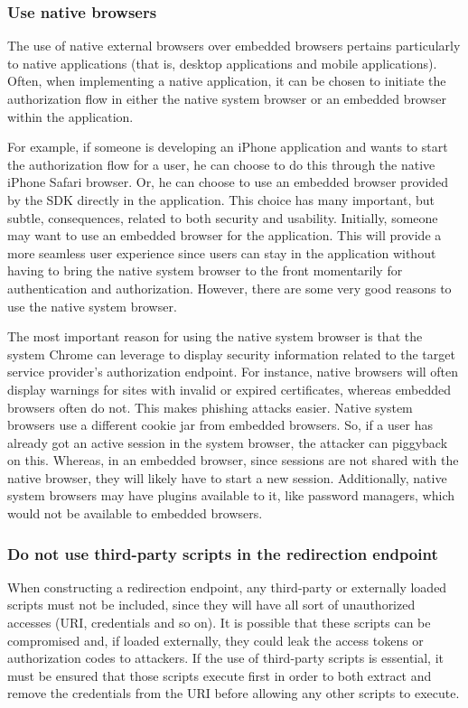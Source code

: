 \subsubsection{Use native browsers}
\label{native}
The use of native external browsers over embedded browsers pertains particularly to native applications (that is, desktop applications and mobile applications). Often, when implementing a native application, it can be chosen to initiate the authorization flow in either the native system browser or an embedded browser within the application.

For example, if someone is developing an iPhone application and wants to start the authorization flow for a user, he can choose to do this through the native iPhone Safari browser. Or, he can choose to use an embedded browser provided by the SDK directly in the application. This choice has many important, but subtle, consequences, related to both security and usability. Initially, someone may want to use an embedded browser for the application. This will provide a more seamless user experience since users can stay in the application without having to bring the native system browser to the front momentarily for authentication and authorization. However, there are some very good reasons to use the native system browser.

The most important reason for using the native system browser is that the system Chrome can leverage to display security information related to the target service provider's authorization endpoint. For instance, native browsers will often display warnings for sites with invalid or expired certificates, whereas embedded browsers often do not. This makes phishing attacks easier. Native system browsers use a different cookie jar from embedded browsers. So, if a user has already got an active session in the system browser, the attacker can piggyback on this. Whereas, in an embedded browser, since sessions are not shared with the native browser, they will likely have to start a new session. Additionally, native system browsers may have plugins available to it, like password managers, which would not be available to embedded browsers.

\subsubsection{Do not use third-party scripts in the redirection endpoint}
When constructing a redirection endpoint, any third-party or externally loaded scripts must not be included, since they will have all sort of unauthorized accesses (URI, credentials and so on). It is possible that these scripts can be compromised and, if loaded externally, they could leak the access tokens or authorization codes to attackers.
If the use of third-party scripts is essential, it must be ensured that those scripts execute first in order to both extract and remove the credentials from the URI before allowing any other scripts to execute.

